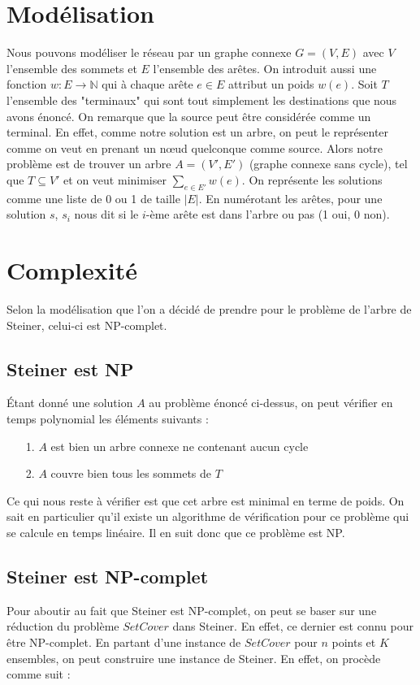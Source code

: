 \documentclass[11pt,french]{report}
\begin{document}
	\section{Modélisation\label{Modélisation}}
	Nous pouvons modéliser le réseau par un graphe connexe $G = (V, E)$ avec $V$ l'ensemble des sommets et $E$ l'ensemble des arêtes. On introduit aussi une fonction $w:E\rightarrow \mathbb{N}$ qui à chaque arête $e\in E$ attribut un poids $w(e)$. Soit $T$ l'ensemble des "terminaux" qui sont tout simplement les destinations que nous avons énoncé. On remarque que la source peut être considérée comme un terminal. En effet, comme notre solution est un arbre, on peut le représenter comme on veut en prenant un nœud quelconque comme source. Alors notre problème est de trouver un arbre $A = (V', E')$ (graphe connexe sans cycle), tel que $T\subseteq V'$ et on veut minimiser \label{poids}{$\sum_{e\in E'}w(e)$}. On représente les solutions comme une liste de 0 ou 1 de taille $|E|$. En numérotant les arêtes, pour une solution $s$, $s_i$ nous dit si le $i$-ème arête est dans l'arbre ou pas (1 oui, 0 non).
	\section{Complexité\label{Complexité}}
        Selon la modélisation que l'on a décidé de prendre pour le problème de l'arbre de Steiner, celui-ci est NP-complet.

        \subsection{Steiner est NP}
        Étant donné une solution $A$ au problème énoncé ci-dessus, on peut vérifier en temps polynomial les éléments suivants :

        \begin{itemize}
	\item[1.] $A$ est bien un arbre connexe ne contenant aucun cycle
        \item[2.] $A$ couvre bien tous les sommets de $T$
	\end{itemize}

        Ce qui nous reste à vérifier est que cet arbre est minimal en terme de poids. On sait en particulier qu'il existe un algorithme de vérification pour ce problème qui se calcule en temps linéaire. Il en suit donc que ce problème est NP.

        \subsection{Steiner est NP-complet}
        Pour aboutir au fait que Steiner est NP-complet, on peut se baser sur une réduction du problème $Set Cover$ dans Steiner. En effet, ce dernier est connu pour être NP-complet.
        En partant d'une instance de $Set Cover$ pour $n$ points et $K$ ensembles, on peut construire une instance de Steiner. En effet, on procède comme suit :
        
\end{document}
